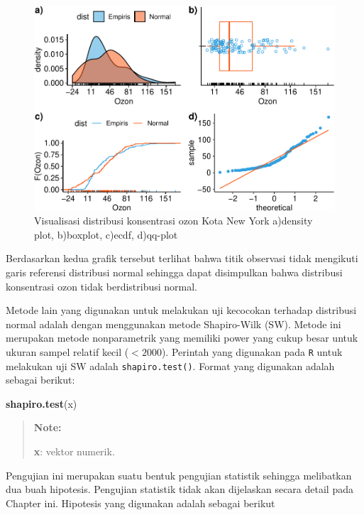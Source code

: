 \documentclass[]{book}
\newenvironment{Shaded}{\begin{snugshade}}{\end{snugshade}}
\newcommand{\KeywordTok}[1]{\textcolor[rgb]{0.13,0.29,0.53}{\textbf{#1}}}
\newcommand{\NormalTok}[1]{#1}
\begin{document}
\begin{figure}

{\centering \includegraphics[width=0.9\linewidth]{EnvStat_files/figure-latex/normvis7-1} 

}

\caption{Visualisasi distribusi konsentrasi ozon Kota New York a)density plot, b)boxplot, c)ecdf, d)qq-plot}\label{fig:normvis7}
\end{figure}

Berdasarkan kedua grafik tersebut terlihat bahwa titik observasi tidak
mengikuti garis referensi distribusi normal sehingga dapat disimpulkan
bahwa distribusi konsentrasi ozon tidak berdistribusi normal.

Metode lain yang digunakan untuk melakukan uji kecocokan terhadap
distribusi normal adalah dengan menggunakan metode Shapiro-Wilk (SW).
Metode ini merupakan metode nonparametrik yang memiliki power yang cukup
besar untuk ukuran sampel relatif kecil (\(<2000\)). Perintah yang
digunakan pada \texttt{R} untuk melakukan uji SW adalah
\texttt{shapiro.test()}. Format yang digunakan adalah sebagai berikut:

\begin{Shaded}
\begin{Highlighting}[]
\KeywordTok{shapiro.test}\NormalTok{(x)}
\end{Highlighting}
\end{Shaded}

\begin{quote}
\textbf{Note: }

\textbf{x}: vektor numerik.
\end{quote}

Pengujian ini merupakan suatu bentuk pengujian statistik sehingga
melibatkan dua buah hipotesis. Pengujian statistik tidak akan dijelaskan
secara detail pada Chapter ini. Hipotesis yang digunakan adalah sebagai
berikut
\end{document}
